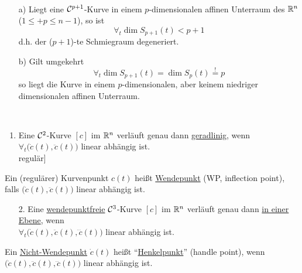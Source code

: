 \begin{satz}\label{satz112} \(\)
 \begin{enumerate}
  \item[a)] Liegt eine \(\mathcal{C}^{p+1}\)-Kurve in einem \(p\)-dimensionalen affinen Unterraum des \(\mathbb{R}^n\) (\(1 \le +p \le n-1 \)), so ist
  \[
   \forall_t \dim S_{p+1}(t) < p+1
  \]
  d.h. der (\(p+1\))-te Schmiegraum degeneriert.
  \item[b)] Gilt umgekehrt 
  \[
   \forall_t \dim S_{p+1}(t) = \dim S_p(t) \stackrel{!}{=} p
  \]
  so liegt die Kurve in einem \(p\)-dimensionalen, aber keinem niedriger dimensionalen affinen Unterraum.
 \end{enumerate}
\end{satz}

\begin{anwendung} \(\)
 \begin{enumerate}
  \item Eine \(\mathcal{C}^2\)-Kurve \([c]\) im \(\mathbb{R}^n\) verläuft genau dann \uline{geradlinig}, wenn \(\forall_t \big(\dot c(t), \ddot c(t)\big) \) linear abhängig ist. \\
  \big["`\(\Rightarrow\)"' nach a), "`\(\Leftarrow\)"' nach b), da \([c]\) regulär\big]
 \end{enumerate}
 \begin{definition}
  Ein (regulärer) Kurvenpunkt \(c(t)\) heißt \uline{Wendepunkt} (WP, inflection point), falls \(\big(\dot c(t), \ddot c(t)\big)\) linear abhängig ist.
 \end{definition}
 \begin{enumerate}
  \item[2.] Eine \uline{wendepunktfreie} \(\mathcal{C}^3\)-Kurve \([c]\) im \(\mathbb{R}^n\) verläuft genau dann \uline{in einer Ebene}, wenn \\ 
  \(\forall_t \big( \dot c(t), \ddot c(t), \dddot c(t) \big) \) linear abhängig ist.
 \end{enumerate}
 \begin{definition}
  Ein \uline{Nicht-Wendepunkt} \(\dot c(t)\) heißt "`\uline{Henkelpunkt}"' (handle point), wenn \( \big( \dot c(t), \ddot c(t), \dddot c(t) \big) \) linear abhängig ist.
 \end{definition}

\end{anwendung}

